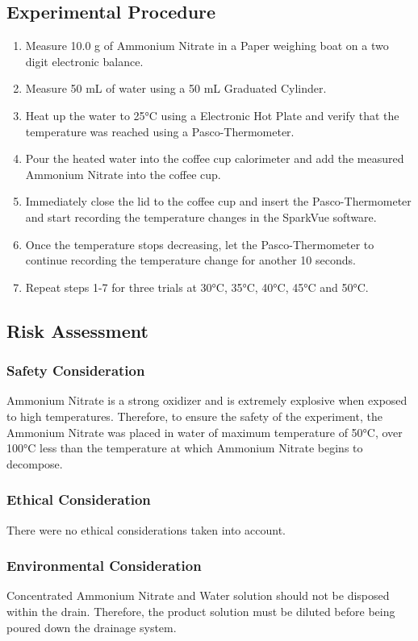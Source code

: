 \documentclass{article}
\begin{document}
\subsection{Experimental Procedure}
\begin{enumerate}
    \item Measure 10.0 g of Ammonium Nitrate in a Paper weighing boat on a two digit electronic balance. 
    \item Measure 50 mL of water using a 50 mL Graduated Cylinder.
    \item Heat up the water to 25°C using a Electronic Hot Plate and verify that the temperature was reached using a Pasco-Thermometer.
    \item Pour the heated water into the coffee cup calorimeter and add the measured Ammonium Nitrate into the coffee cup.
    \item Immediately close the lid to the coffee cup and insert the Pasco-Thermometer and start recording the temperature changes in the SparkVue software.
    \item Once the temperature stops decreasing, let the Pasco-Thermometer to continue recording the temperature change for another 10 seconds.
    \item Repeat steps 1-7 for three trials at 30°C, 35°C, 40°C, 45°C and 50°C.
\end{enumerate}

\subsection{Risk Assessment}
\subsubsection{Safety Consideration}
Ammonium Nitrate is a strong oxidizer and is extremely explosive when exposed to high temperatures. Therefore, to ensure the safety of the experiment, the Ammonium Nitrate was placed in water of maximum temperature of 50°C, over 100°C less than the temperature at which Ammonium Nitrate begins to decompose. 
\subsubsection{Ethical Consideration}
There were no ethical considerations taken into account.
\subsubsection{Environmental Consideration}
Concentrated Ammonium Nitrate and Water solution should not be disposed within the drain. Therefore, the product solution must be diluted before being poured down the drainage system.
\end{document}
